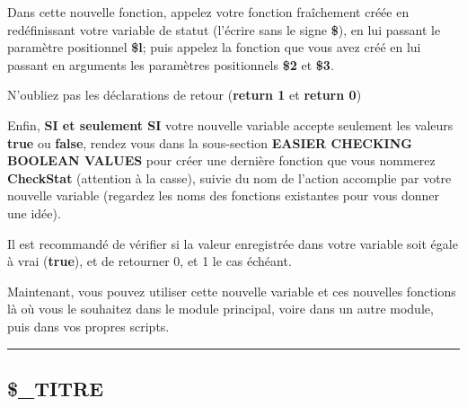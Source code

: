 \documentclass[a4paper,10pt]{article}
\begin{document}
\begin{justify}
    Dans cette nouvelle fonction, appelez votre fonction fraîchement créée en redéfinissant votre variable de statut (l'écrire sans le signe \textbf{\$}), en lui passant le paramètre positionnel \textbf{\$l}; puis appelez la fonction que vous avez créé en lui passant en arguments les paramètres positionnels \textbf{\$2} et \textbf{\$3}.
\end{justify}

\begin{justify}
    N'oubliez pas les déclarations de retour (\textbf{\color{gray}return 1} et \textbf{\color{gray}return 0})\\[1\baselineskip]
\end{justify}


\begin{justify}
    Enfin, \textbf{SI et seulement SI} votre nouvelle variable accepte seulement les valeurs \textbf{true} ou \textbf{false}, rendez vous dans la sous-section \textbf{EASIER CHECKING BOOLEAN VALUES} pour créer une dernière fonction que vous nommerez \textbf{\color{mauve}CheckStat} (attention à la casse), suivie du nom de l'action accomplie par votre nouvelle variable (regardez les noms des fonctions existantes pour vous donner une idée).
\end{justify}

\begin{justify}
Il est recommandé de vérifier si la valeur enregistrée dans votre variable soit égale à vrai (\textbf{true}), et de retourner 0, et 1 le cas échéant.
\end{justify}

\begin{justify}
    Maintenant, vous pouvez utiliser cette nouvelle variable et ces nouvelles fonctions là où vous le souhaitez dans le module principal, voire dans un autre module, puis dans vos propres scripts.
\end{justify}




\color{green}\par\noindent\rule{\textwidth}{0.4pt}\color{white}

\color{green}
\subsection{\$\_TITRE}\color{white}
\end{document}
